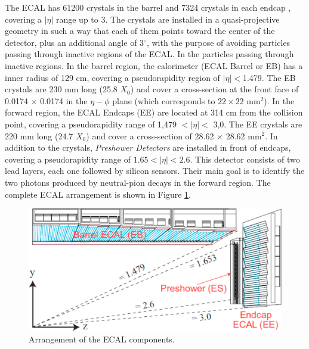\noindent The ECAL has 61200 crystals in the barrel and 7324 crystals in each endcap \cite{chp2:CMSTDR}, covering a 
$|\eta|$ range up to 3. The crystals are installed in a quasi-projective geometry 
in such a way that each of them points toward the center of the detector, plus an additional angle
of 3$^{\circ}$, with the purpose of avoiding particles passing through inactive regions of the ECAL. In the 
particles passing through inactive regions. In the barrel region, the calorimeter (ECAL Barrel or EB) has a 
inner radius of 129 cm, covering a pseudorapidity region of $|\eta| < $1.479. The EB crystals 
are 230 mm long (25.8 $X_{0}$) and cover a cross-section at the front face of 0.0174 $\times$ 0.0174 
in the $\eta-\phi$ plane (which corresponds to $22\times22$ mm$^{2}$). In the forward region,
the ECAL Endcaps (EE) are located at 314 cm from the collision point, covering a pseudorapidity range of
1,479 $ < |\eta| < $ 3,0. The EE crystals are 220 mm long (24.7 $X_{0}$) and cover
a cross-section of 28.62 $\times$ 28.62 mm$^{2}$. In addition to the crystals, \textit{Preshower Detectors}
are installed in front of endcaps, covering a pseudorapidity range of  $1.65<|\eta|<2.6$. This detector consists of two 
lead layers, each one followed by silicon sensors. Their main goal is 
to identify the two photons produced by neutral-pion decays in the
forward region. The complete ECAL arrangement is shown in Figure \ref{figchp2:ECAL}.



\begin{center}
\begin{figure}[h]
\centering
\includegraphics[scale=0.38]{figuras/Chapter2/ECAL.pdf}
\caption{Arrangement of the ECAL components.}\label{figchp2:ECAL}
\end{figure}
\end{center}

